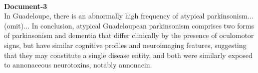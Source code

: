 \documentclass[10pt, a4paper, logo]{googledeepmind} %
\begin{document}
\begin{tcolorbox}
\begin{flushleft}
\\
\vspace{1em}
\textbf{Document-3}\\
In Guadeloupe, there is an abnormally high frequency of atypical parkinsonism...(omit)...
In conclusion, atypical Guadeloupean parkinsonism comprises two forms of parkinsonism and dementia that differ clinically by the presence of oculomotor signs, but have similar cognitive profiles and neuroimaging features, suggesting that they may constitute a single disease entity, and both were similarly exposed to annonaceous neurotoxins, notably annonacin.

\end{flushleft}
\end{tcolorbox}
\end{document}
